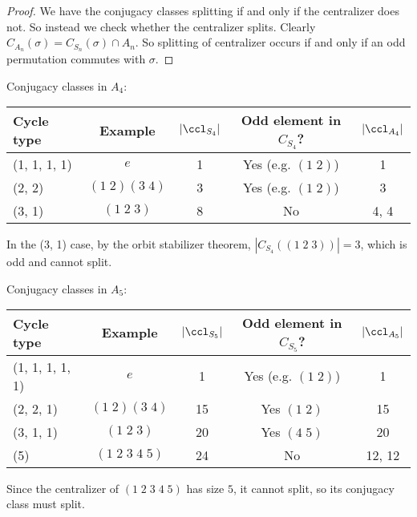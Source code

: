 \documentclass[a4paper]{article}
\begin{document}
  \begin{proof}
    We have the conjugacy classes splitting if and only if the centralizer does not. So instead we check whether the centralizer splits. Clearly $C_{A_n}(\sigma) = C_{S_n}(\sigma)\cap A_n$. So splitting of centralizer occurs if and only if an odd permutation commutes with $\sigma$.
  \end{proof}

  \begin{eg}
    Conjugacy classes in $A_4$:\vspace{4pt}                                                         \\
    \begin{tabular}{lcccc}
      \toprule
      Cycle type   & Example          & $|\ccl_{S_4}|$ & Odd element in $C_{S_4}$? & $|\ccl_{A_4}|$ \\
      \midrule
      (1, 1, 1, 1) & $e$              & 1              & Yes (e.g. $(1\; 2)$)      & 1              \\
      (2, 2)       & $(1\; 2)(3\; 4)$ & 3              & Yes (e.g. $(1\; 2)$)      & 3              \\
      (3, 1)       & $(1\; 2\; 3)$    & 8              & No                        & 4, 4           \\
      \bottomrule
    \end{tabular}

    \vspace{4pt}
    \noindent In the (3, 1) case, by the orbit stabilizer theorem, $|C_{S_4}((1\; 2\; 3))| = 3$, which is odd and cannot split. 
  \end{eg}

  \begin{eg}
    Conjugacy classes in $A_5$:\vspace{4pt}                                                                 \\
    \begin{tabular}{lcccc}
      \toprule
      Cycle type      & Example               & $|\ccl_{S_5}|$ & Odd element in $C_{S_5}$? & $|\ccl_{A_5}|$ \\
      \midrule
      (1, 1, 1, 1, 1) & $e$                   & 1              & Yes (e.g. $(1\; 2)$)      & 1              \\
      (2, 2, 1)       & $(1\; 2)(3\; 4)$      & 15             & Yes $(1\; 2)$             & 15             \\
      (3, 1, 1)       & $(1\; 2\; 3)$         & 20             & Yes $(4\; 5)$             & 20             \\
      (5)             & $(1\; 2\; 3\; 4\; 5)$ & 24             & No                        & 12, 12         \\
      \bottomrule
    \end{tabular}

    Since the centralizer of $(1\; 2\; 3\; 4\; 5)$ has size $5$, it cannot split, so its conjugacy class must split.
  \end{eg}
\end{document}
